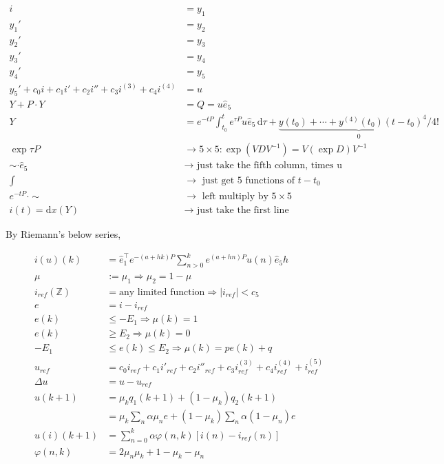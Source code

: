 \documentclass[11pt]{article}
\begin{document}
\begin{align}
i &= y_1 \\
y_1' &= y_2 \\
y_2' &= y_3 \\
y_3' &= y_4 \\
y_4' &= y_5 \\
y_5' + c_0 i + c_1 i' + c_2 i'' + c_3 i^{(3)} + c_4 i^{(4)} &= u \\
Y + P\cdot Y &= Q = u \hat e_5 \\
Y &= e^{-tP} \int_{t_0}^t e^{\tau P} u \hat e_5\,\mathrm{d}\tau + \underbrace{y(t_0) + \cdots + y^{(4)}(t_0) (t - t_0)^4/4!}_0 \\
\exp \tau P &\to 5 \times 5: \exp (VDV^{-1}) = V (\exp D) V^{-1} \\
\sim \cdot \hat e_5 &\to \text{ just take the fifth column, times u} \\
\int &\to \text{ just get 5 functions of }t - t_0 \\
e^{-tP}\cdot \sim &\to \text{ left multiply by }5 \times 5 \\
i(t) = \mathrm{d}x (Y) &\to \text{ just take the first line}
\end{align}

\vspace{100mm}

By Riemann's below series,

\begin{align}
  i(u)(k) &= \hat e_1^\top e^{-(a + hk)P}\sum_{n > 0}^k e^{(a + hn)P} u(n) \hat e_5 h \\  \mu &:= \mu_1 \Rightarrow \mu_2 = 1 - \mu \\
  i_{ref}(\mathbb{Z}) &= \text{any limited function} \Rightarrow |i_{ref}| < c_5 \\
  e &= i - i_{ref} \\
  e(k) &\le - E_1 \Rightarrow \mu(k) = 1 \\
  e(k) &\ge E_2 \Rightarrow \mu(k) = 0 \\
  - E_1 &\le e(k) \le E_2 \Rightarrow \mu(k) = p e(k) + q \\
  u_{ref} &= c_0 i_{ref} + c_1 i'_{ref} + c_2 i''_{ref} + c_3 i^{(3)}_{ref} + c_4 i^{(4)}_{ref} + i^{(5)}_{ref} \\
  \Delta u &= u - u_{ref} \\
u(k+1) &= \mu_k q_1(k+1) + (1 - \mu_k) q_2(k+1) \\
&= \mu_k \sum_n \alpha \mu_n e + (1 - \mu_k) \sum_n \alpha (1 - \mu_n) e \\
u(i)(k+1) &= \sum_{n = 0}^k \alpha \varphi(n,k) [i(n) - i_{ref}(n)] \\
\varphi(n, k) &= 2 \mu_n \mu_k + 1 - \mu_k - \mu_n
\end{align}
\end{document}
